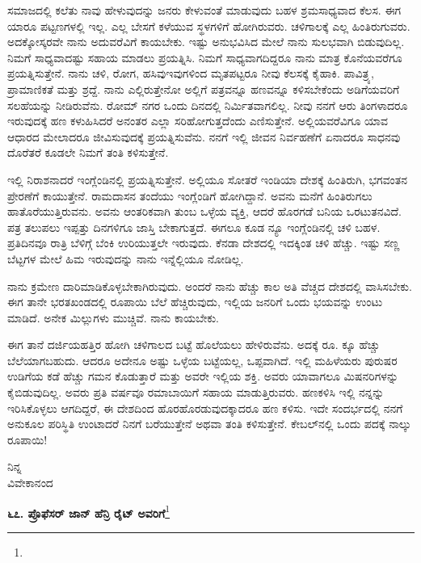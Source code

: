 ಸಮಾಜದಲ್ಲಿ ಕಲೆತು ನಾವು ಹೇಳುವುದನ್ನು ಜನರು ಕೇಳುವಂತೆ ಮಾಡುವುದು ಬಹಳ ಶ್ರಮಸಾಧ್ಯವಾದ ಕೆಲಸ. ಈಗ ಯಾರೂ ಪಟ್ಟಣಗಳಲ್ಲಿ ಇಲ್ಲ. ಎಲ್ಲ ಬೇಸಗೆ ಕಳೆಯುವ ಸ್ಥಳಗಳಿಗೆ ಹೋಗಿರುವರು. ಚಳಿಗಾಲಕ್ಕೆ ಎಲ್ಲ ಹಿಂತಿರುಗುವರು. ಅದಕ್ಕೋಸ್ಕರವೇ ನಾನು ಅದುವರೆವಿಗೆ ಕಾಯಬೇಕು. ಇಷ್ಟು ಅನುಭವಿಸಿದ ಮೇಲೆ ನಾನು ಸುಲಭವಾಗಿ ಬಿಡುವುದಿಲ್ಲ. ನಿಮಗೆ ಸಾಧ್ಯವಾದಷ್ಟು ಸಹಾಯ ಮಾಡಲು ಪ್ರಯತ್ನಿಸಿ. ನಿಮಗೆ ಸಾಧ್ಯವಾಗದಿದ್ದರೂ ನಾನು ಮಾತ್ರ ಕೊನೆಯವರೆಗೂ ಪ್ರಯತ್ನಿಸುತ್ತೇನೆ. ನಾನು ಚಳಿ, ರೋಗ, ಹಸಿವು\enginline{-}ಇವುಗಳಿಂದ ಮೃತಪಟ್ಟರೂ ನೀವು ಕೆಲಸಕ್ಕೆ ಕೈಹಾಕಿ. ಪಾವಿತ್ರ್ಯ, ಪ್ರಾಮಾಣಿಕತೆ ಮತ್ತು ಶ್ರದ್ದೆ. ನಾನು ಎಲ್ಲಿರುತ್ತೇನೋ ಅಲ್ಲಿಗೆ ಪತ್ರವನ್ನೂ ಹಣವನ್ನೂ ಕಳಿಸಬೇಕೆಂದು ಅಡಿಗೆಯವರಿಗೆ ಸಲಹೆಯನ್ನು ನೀಡಿರುವೆನು. ರೋಮ್ ನಗರ ಒಂದು ದಿನದಲ್ಲಿ ನಿರ್ಮಿತವಾಗಲಿಲ್ಲ. ನೀವು ನನಗೆ ಆರು ತಿಂಗಳಾದರೂ ಇರುವುದಕ್ಕೆ ಹಣ ಕಳುಹಿಸಿದರೆ ಅನಂತರ ಎಲ್ಲಾ ಸರಿಹೋಗುತ್ತದೆಂದು ಎಣಿಸುತ್ತೇನೆ. ಅಲ್ಲಿಯವರೆವಿಗೂ ಯಾವ ಆಧಾರದ ಮೇಲಾದರೂ ಜೀವಿಸುವುದಕ್ಕೆ ಪ್ರಯತ್ನಿಸುವೆನು. ನನಗೆ ಇಲ್ಲಿ ಜೀವನ ನಿರ್ವಹಣೆಗೆ ಏನಾದರೂ ಸಾಧನವು ದೊರೆತರೆ ಕೂಡಲೇ ನಿಮಗೆ ತಂತಿ ಕಳಿಸುತ್ತೇನೆ.

ಇಲ್ಲಿ ನಿರಾಶನಾದರೆ ಇಂಗ್ಲೆಂಡಿನಲ್ಲಿ ಪ್ರಯತ್ನಿಸುತ್ತೇನೆ. ಅಲ್ಲಿಯೂ ಸೋತರೆ ಇಂಡಿಯಾ ದೇಶಕ್ಕೆ ಹಿಂತಿರುಗಿ, ಭಗವಂತನ ಪ್ರೇರಣೆಗೆ ಕಾಯುತ್ತೇನೆ. ರಾಮದಾಸನ ತಂದೆಯು ಇಂಗ್ಲೆಂಡಿಗೆ ಹೋಗಿದ್ದಾನೆ. ಅವನು ಮನೆಗೆ ಹಿಂತಿರುಗಲು ಹಾತೊರೆಯುತ್ತಿರುವನು. ಅವನು ಆಂತರಿಕವಾಗಿ ತುಂಬ ಒಳ್ಳೆಯ ವ್ಯಕ್ತಿ, ಆದರೆ ಹೊರಗಡೆ ಬನಿಯ ಒರಟುತನವಿದೆ. ಪತ್ರ ತಲುಪಲು ಇಪ್ಪತ್ತು ದಿನಗಳಿಗೂ ಜಾಸ್ತಿ ಬೇಕಾಗುತ್ತದೆ. ಈಗಲೂ ಕೂಡ ನ್ಯೂ ಇಂಗ್ಲೆಂಡಿನಲ್ಲಿ ಚಳಿ ಬಹಳ. ಪ್ರತಿದಿನವೂ ರಾತ್ರಿ ಬೆಳಿಗ್ಗೆ ಬೆಂಕಿ ಉರಿಯುತ್ತಲೇ ಇರುವುದು. ಕೆನಡಾ ದೇಶದಲ್ಲಿ ಇದಕ್ಕಿಂತ ಚಳಿ ಹೆಚ್ಚು. ಇಷ್ಟು ಸಣ್ಣ ಬೆಟ್ಟಗಳ ಮೇಲೆ ಹಿಮ ಇರುವುದನ್ನು ನಾನು ಇನ್ನೆಲ್ಲಿಯೂ ನೋಡಿಲ್ಲ.

ನಾನು ಕ್ರಮೇಣ ದಾರಿಮಾಡಿಕೊಳ್ಳಬೇಕಾಗಿರುವುದು. ಅಂದರೆ ನಾನು ಹೆಚ್ಚು ಕಾಲ ಅತಿ ವೆಚ್ಚದ ದೇಶದಲ್ಲಿ ವಾಸಿಸಬೇಕು. ಈಗ ತಾನೇ ಭರತಖಂಡದಲ್ಲಿ ರೂಪಾಯಿ ಬೆಲೆ ಹೆಚ್ಚಿರುವುದು, ಇಲ್ಲಿಯ ಜನರಿಗೆ ಒಂದು ಭಯವನ್ನು ಉಂಟು ಮಾಡಿದೆ. ಅನೇಕ ಮಿಲ್ಲುಗಳು ಮುಚ್ಚಿವೆ. ನಾನು ಕಾಯಬೇಕು.

ಈಗ ತಾನೆ ದರ್ಜಿಯಹತ್ತಿರ ಹೋಗಿ ಚಳಿಗಾಲದ ಬಟ್ಟೆ ಹೊಲೆಯಲು ಹೇಳಿರುವೆನು. ಅದಕ್ಕೆ ರೂ.  ಕ್ಕೂ ಹೆಚ್ಚು ಬೆಲೆಯಾಗಬಹುದು. ಆದರೂ ಅದೇನೂ ಅಷ್ಟು ಒಳ್ಳೆಯ ಬಟ್ಟೆಯಲ್ಲ, ಒಪ್ಪವಾಗಿದೆ. ಇಲ್ಲಿ ಮಹಿಳೆಯರು ಪುರುಷರ ಉಡಿಗೆಯ ಕಡೆ ಹೆಚ್ಚು ಗಮನ ಕೊಡುತ್ತಾರೆ ಮತ್ತು ಅವರೇ ಇಲ್ಲಿಯ ಶಕ್ತಿ. ಅವರು ಯಾವಾಗಲೂ ಮಿಷನರಿಗಳನ್ನು ಕೈಬಿಡುವುದಿಲ್ಲ. ಅವರು ಪ್ರತಿ ವರ್ಷವೂ ರಮಾಬಾಯಿಗೆ ಸಹಾಯ ಮಾಡುತ್ತಿರುವರು. ಹಣಕಳಿಸಿ ಇಲ್ಲಿ ನನ್ನನ್ನು ಇರಿಸಿಕೊಳ್ಳಲು ಆಗದಿದ್ದರೆ, ಈ ದೇಶದಿಂದ ಹೊರಹೊರಡುವುದಕ್ಕಾದರೂ ಹಣ ಕಳಿಸು. ಇದೇ ಸಂದರ್ಭದಲ್ಲಿ ನನಗೆ ಅನುಕೂಲ ಪರಿಸ್ಥಿತಿ ಉಂಟಾದರೆ ನಿನಗೆ ಬರೆಯುತ್ತೇನೆ ಅಥವಾ ತಂತಿ ಕಳಿಸುತ್ತೇನೆ. ಕೇಬಲ್‌ನಲ್ಲಿ ಒಂದು ಪದಕ್ಕೆ ನಾಲ್ಕು ರೂಪಾಯಿ!

\vspace{-.3cm}

{\flushright
ನಿನ್ನ\\ವಿವೇಕಾನಂದ\par}

\begin{center}
\textbf{೬೭. ಪ್ರೊಫೆಸರ್ ಜಾನ್ ಹೆನ್ರಿ ರೈಟ್ ಅವರಿಗೆ}\footnote{}
\end{center}

